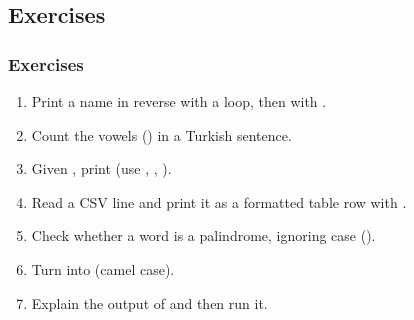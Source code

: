 \documentclass[aspectratio=169,10pt,compress]{beamer}
\begin{document}
\subsection[Exercises]{Exercises}




\begin{frame}[t,fragile] \frametitle{Exercises}
  \begin{enumerate}\small
    \item Print a name in reverse with a loop, then with .
    \item Count the vowels () in a Turkish sentence.
    \item Given , print  (use , , ).
    \item Read a CSV line  and print it as a formatted table row with .
    \item Check whether a word is a palindrome, ignoring case ().
    \item Turn  into  (camel case).
    \item Explain the output of  and then run it.
  \end{enumerate}
\end{frame}




\begin{frame}[t,fragile]
	\begin{center}
		\vspace{4cm}
	\end{center}
\end{frame}
\end{document}
